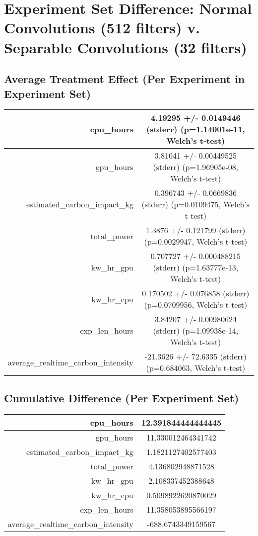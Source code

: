 \documentclass{article}%
\begin{document}
%
\normalsize%
\section{Experiment Set Difference: Normal Convolutions (512 filters) v. Separable Convolutions (32 filters)}%
\label{sec:Experiment Set Difference Normal Convolutions (512 filters) v. Separable Convolutions (32 filters)}%
\subsection{Average Treatment Effect (Per Experiment in Experiment Set)}%
\label{subsec:Average Treatment Effect (Per Experiment in Experiment Set)}%
\begin{tabular}{|r|c|}%
\hline%
cpu\_hours&4.19295 +/{-} 0.0149446 (stderr) (p=1.14001e{-}11, Welch's t{-}test)\\%
\hline%
gpu\_hours&3.81041 +/{-} 0.00449525 (stderr) (p=1.96905e{-}08, Welch's t{-}test)\\%
\hline%
estimated\_carbon\_impact\_kg&0.396743 +/{-} 0.0669836 (stderr) (p=0.0109475, Welch's t{-}test)\\%
\hline%
total\_power&1.3876 +/{-} 0.121799 (stderr) (p=0.0029947, Welch's t{-}test)\\%
\hline%
kw\_hr\_gpu&0.707727 +/{-} 0.000488215 (stderr) (p=1.63777e{-}13, Welch's t{-}test)\\%
\hline%
kw\_hr\_cpu&0.170502 +/{-} 0.076858 (stderr) (p=0.0709956, Welch's t{-}test)\\%
\hline%
exp\_len\_hours&3.84207 +/{-} 0.00980624 (stderr) (p=1.09938e{-}14, Welch's t{-}test)\\%
\hline%
average\_realtime\_carbon\_intensity&{-}21.3626 +/{-} 72.6335 (stderr) (p=0.684063, Welch's t{-}test)\\%
\hline%
\end{tabular}

%
\subsection{Cumulative Difference (Per Experiment Set)}%
\label{subsec:Cumulative Difference (Per Experiment Set)}%
\begin{tabular}{|r|c|}%
\hline%
cpu\_hours&12.391844444444445\\%
\hline%
gpu\_hours&11.330012464341742\\%
\hline%
estimated\_carbon\_impact\_kg&1.1821127402577403\\%
\hline%
total\_power&4.136802948871528\\%
\hline%
kw\_hr\_gpu&2.108337452388648\\%
\hline%
kw\_hr\_cpu&0.5098922620870029\\%
\hline%
exp\_len\_hours&11.358053895566197\\%
\hline%
average\_realtime\_carbon\_intensity&{-}688.6743349159567\\%
\hline%
\end{tabular}

%
\end{document}
